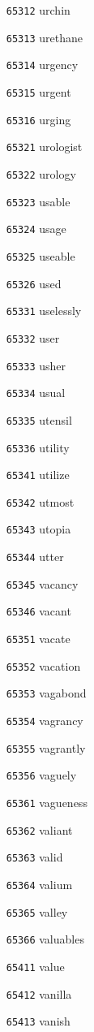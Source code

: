 \documentclass[twoside,11pt]{article}
\begin{document}
\begin{multicols}{5}
\begin{enumerate}
\item[\texttt{65312}] urchin
\item[\texttt{65313}] urethane
\item[\texttt{65314}] urgency
\item[\texttt{65315}] urgent
\item[\texttt{65316}] urging
\item[\texttt{65321}] urologist
\item[\texttt{65322}] urology
\item[\texttt{65323}] usable
\item[\texttt{65324}] usage
\item[\texttt{65325}] useable
\item[\texttt{65326}] used
\item[\texttt{65331}] uselessly
\item[\texttt{65332}] user
\item[\texttt{65333}] usher
\item[\texttt{65334}] usual
\item[\texttt{65335}] utensil
\item[\texttt{65336}] utility
\item[\texttt{65341}] utilize
\item[\texttt{65342}] utmost
\item[\texttt{65343}] utopia
\item[\texttt{65344}] utter
\item[\texttt{65345}] vacancy
\item[\texttt{65346}] vacant
\item[\texttt{65351}] vacate
\item[\texttt{65352}] vacation
\item[\texttt{65353}] vagabond
\item[\texttt{65354}] vagrancy
\item[\texttt{65355}] vagrantly
\item[\texttt{65356}] vaguely
\item[\texttt{65361}] vagueness
\item[\texttt{65362}] valiant
\item[\texttt{65363}] valid
\item[\texttt{65364}] valium
\item[\texttt{65365}] valley
\item[\texttt{65366}] valuables
\item[\texttt{65411}] value
\item[\texttt{65412}] vanilla
\item[\texttt{65413}] vanish

\end{enumerate}
\end{multicols}
\end{document}
